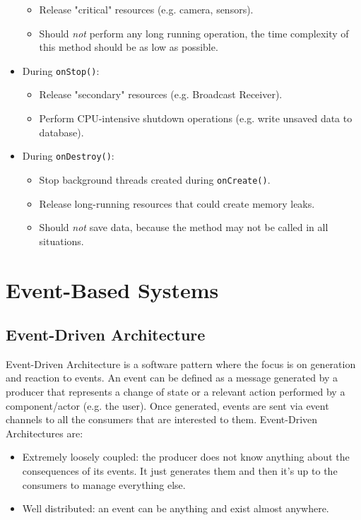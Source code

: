\documentclass[11pt,a4paper,notitlepage]{article}
\begin{document}
\begin{itemize}
\begin{itemize}
		\item Release "critical" resources (e.g. camera, sensors).
		\item Should \textit{not} perform any long running operation, the time complexity of this method should be as low as possible.
	\end{itemize}
	\item During \texttt{onStop()}:
	\begin{itemize}
		\item Release "secondary" resources (e.g. Broadcast Receiver).
		\item Perform CPU-intensive shutdown operations (e.g. write unsaved data to database).
	\end{itemize}
	\item During \texttt{onDestroy()}:
	\begin{itemize}
		\item Stop background threads created during \texttt{onCreate()}.
		\item Release long-running resources that could create memory leaks.
		\item Should \textit{not} save data, because the method may not be called in all situations.
	\end{itemize}

\end{itemize}

\section{Event-Based Systems}

\subsection{Event-Driven Architecture}
Event-Driven Architecture is a software pattern where the focus is on generation and reaction to events. An event can be defined as a message generated by a producer that represents a change of state or a relevant action performed by a component/actor (e.g. the user). Once generated, events are sent via event channels to all the consumers that are interested to them. Event-Driven Architectures are:
\begin{itemize}
	\item Extremely loosely coupled: the producer does not know anything about the consequences of its events. It just generates them and then it's up to the consumers to manage everything else.
	\item Well distributed: an event can be anything and exist almost anywhere.
\end{itemize}
\end{document}
